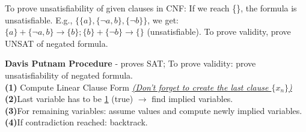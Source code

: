 \documentclass{article}
\begin{document}
\begin{multicols}{4}
To prove unsatisfiability of given clauses in CNF: If we reach \{\}, the formula is unsatisfiable. 
E.g., $\{\{a\}, \{\neg a,b\}, \{\neg b\}\}$, we get: $\{a\} + \{ \neg a,b\} \rightarrow \{b\}; \{b\} + \{\neg b\}\rightarrow\{\} $ (unsatisfiable).
To prove validity, prove UNSAT of negated formula.

\textbf{Davis Putnam Procedure} - proves SAT; To prove validity: prove unsatisfiability of negated formula. \\
\textbf{(1)} Compute Linear Clause Form \underline{\textit{(Don't forget to create the last clause $\{x_n\}$)}} \\
\textbf{(2)}Last variable has to be \underline{1} (true) $\rightarrow$ find implied variables. \\
\textbf{(3)}For remaining variables: assume values and compute newly implied variables. \\
\textbf{(4)}If contradiction reached: backtrack.


\end{multicols}
\end{document}
